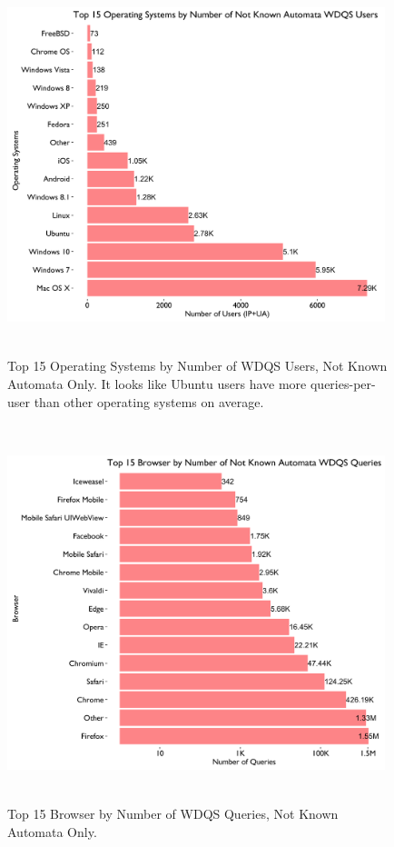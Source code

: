 \documentclass[12pt,]{article}
\begin{document}
\begin{figure}[H]
\centering
\includegraphics[width=11cm,height=11cm,keepaspectratio]{figures/n_user_by_os.png}
\caption{Top 15 Operating Systems by Number of WDQS Users, Not Known
Automata Only. It looks like Ubuntu users have more queries-per-user
than other operating systems on average.}
\end{figure}

\begin{figure}[H]
\centering
\includegraphics[width=11cm,height=11cm,keepaspectratio]{figures/n_query_by_browser.png}
\caption{Top 15 Browser by Number of WDQS Queries, Not Known Automata
Only.}
\end{figure}
\end{document}
